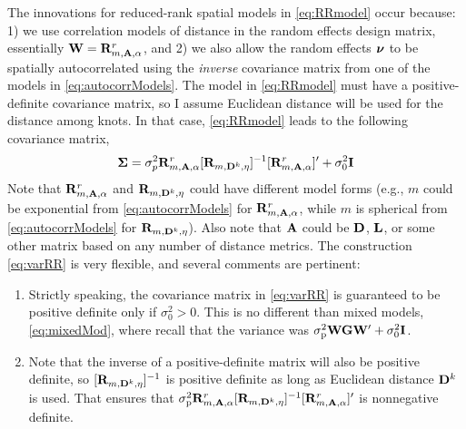 \documentclass[11pt, titlepage]{article}\usepackage[]{graphicx}\usepackage[]{color}
\begin{document}
\begin{spacing}{1.9}
\begin{flushleft}
The innovations for reduced-rank spatial models in \ref{eq:RRmodel} occur because: 1) we use correlation models of distance in the random effects design matrix, essentially $\mathbf{W} = \mathbf{R}^r_{m,\mathbf{A},\alpha}$, and 2) we also allow the random effects $\mbox{\boldmath $\nu$}$ to be spatially autocorrelated using the \emph{inverse} covariance matrix from one of the models in \ref{eq:autocorrModels}.  The model in \ref{eq:RRmodel} must have a positive-definite covariance matrix, so I assume Euclidean distance will be used for the distance among knots.  In that case, \ref{eq:RRmodel} leads to the following covariance matrix,
\begin{equation} \label{eq:varRR}
				\mbox{\boldmath $\Sigma$} = \sigma^2_p\mathbf{R}^r_{m,\mathbf{A},\alpha}[\mathbf{R}_{m,\mathbf{D}^k,\eta}]^{-1}[\mathbf{R}^r_{m,\mathbf{A},\alpha}]^{\prime} + \sigma^2_0\mathbf{I}
\end{equation}
Note that $\mathbf{R}^r_{m,\mathbf{A},\alpha}$ and $\mathbf{R}_{m,\mathbf{D}^k,\eta}$ could have different model forms (e.g., $m$ could be exponential from \ref{eq:autocorrModels} for $\mathbf{R}^r_{m,\mathbf{A},\alpha}$, while $m$ is spherical from \ref{eq:autocorrModels} for $\mathbf{R}_{m,\mathbf{D}^k,\eta}$). Also note that $\mathbf{A}$ could be $\mathbf{D}$, $\mathbf{L}$, or some other matrix based on any number of distance metrics.  The construction \ref{eq:varRR} is very flexible, and several comments are pertinent:
\begin{enumerate}
		\item Strictly speaking, the covariance matrix in \ref{eq:varRR} is guaranteed to be positive definite only if $\sigma_0^2 > 0$. This is no different than mixed models, \ref{eq:mixedMod}, where recall that the variance was $\sigma^2_\textrm{p}\mathbf{W}\mathbf{G}\mathbf{W}^{\prime} + \sigma_0^2\mathbf{I}$.  
		\item Note that the inverse of a positive-definite matrix will also be positive definite, so $[\mathbf{R}_{m,\mathbf{D}^k,\eta}]^{-1}$ is positive definite as long as Euclidean distance $\mathbf{D}^k$ is used.  That ensures that $\sigma^2_\textrm{p}\mathbf{R}^r_{m,\mathbf{A},\alpha}[\mathbf{R}_{m,\mathbf{D}^k,\eta}]^{-1}[\mathbf{R}^r_{m,\mathbf{A},\alpha}]^{\prime}$ is nonnegative definite.

\end{enumerate}
\end{flushleft}
\end{spacing}
\end{document}
